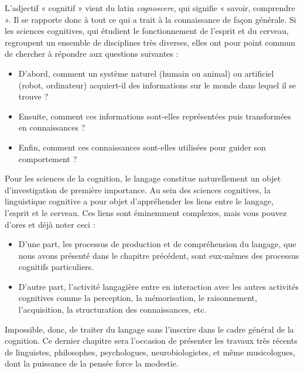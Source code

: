 \begin{keybox}[Introduction]
L’adjectif « cognitif » vient du latin \emph{cognoscere}, qui signifie « savoir, comprendre ». Il se rapporte donc à tout ce qui a trait à la connaissance de façon générale. Si les sciences cognitives, qui étudient le fonctionnement de l’esprit et du cerveau, regroupent un ensemble de disciplines très diverses, elles ont pour point commun de chercher à répondre aux questions suivantes :

\begin{itemize}[leftmargin=1.6em,itemsep=.25em]
\item D’abord, comment un système naturel (humain ou animal) ou artificiel (robot, ordinateur) acquiert-il des informations sur le monde dans lequel il se trouve ?
\item Ensuite, comment ces informations sont-elles représentées puis transformées en connaissances ?
\item Enfin, comment ces connaissances sont-elles utilisées pour guider son comportement ?
\end{itemize}

Pour les sciences de la cognition, le langage constitue naturellement un objet d’investigation de première importance. Au sein des sciences cognitives, la linguistique cognitive a pour objet d’appréhender les liens entre le langage, l’esprit et le cerveau. Ces liens sont éminemment complexes, mais vous pouvez d’ores et déjà noter ceci :

\begin{itemize}[leftmargin=1.6em,itemsep=.25em]
\item D’une part, les processus de production et de compréhension du langage, que nous avons présenté dans le chapitre précédent, sont eux-mêmes des processus cognitifs particuliers.
\item D’autre part, l’activité langagière entre en interaction avec les autres activités cognitives comme la perception, la mémorisation, le raisonnement, l’acquisition, la structuration des connaissances, etc.
\end{itemize}

Impossible, donc, de traiter du langage sans l’inscrire dans le cadre général de la cognition. Ce dernier chapitre sera l’occasion de présenter les travaux très récents de linguistes, philosophes, psychologues, neurobiologistes, et même musicologues, dont la puissance de la pensée force la modestie.
\end{keybox}

